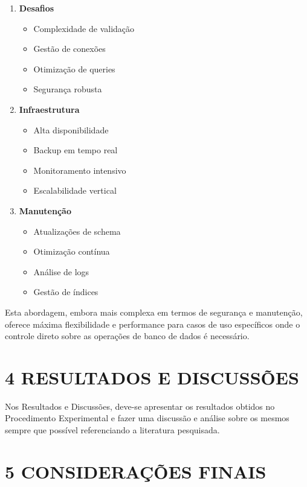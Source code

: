 \documentclass[
]{article}
\providecommand{\tightlist}{%
  \setlength{\itemsep}{0pt}\setlength{\parskip}{0pt}}
\begin{document}
\begin{enumerate}
\def\labelenumi{\arabic{enumi}.}
\item
  \textbf{Desafios}

  \begin{itemize}
  \tightlist
  \item
    Complexidade de validação
  \item
    Gestão de conexões
  \item
    Otimização de queries
  \item
    Segurança robusta
  \end{itemize}
\item
  \textbf{Infraestrutura}

  \begin{itemize}
  \tightlist
  \item
    Alta disponibilidade
  \item
    Backup em tempo real
  \item
    Monitoramento intensivo
  \item
    Escalabilidade vertical
  \end{itemize}
\item
  \textbf{Manutenção}

  \begin{itemize}
  \tightlist
  \item
    Atualizações de schema
  \item
    Otimização contínua
  \item
    Análise de logs
  \item
    Gestão de índices
  \end{itemize}
\end{enumerate}

Esta abordagem, embora mais complexa em termos de segurança e
manutenção, oferece máxima flexibilidade e performance para casos de uso
específicos onde o controle direto sobre as operações de banco de dados
é necessário.

\section{4 RESULTADOS E DISCUSSÕES}\label{resultados-e-discussuxf5es}

Nos Resultados e Discussões, deve-se apresentar os resultados obtidos no
Procedimento Experimental e fazer uma discussão e análise sobre os
mesmos sempre que possível referenciando a literatura pesquisada.

\section{5 CONSIDERAÇÕES FINAIS}\label{considerauxe7uxf5es-finais}
\end{document}
